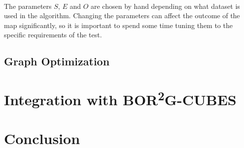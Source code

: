 \documentclass[11pt]{article}
\begin{document}
	\paragraph{}
	The parameters $S$, $E$ and $O$ are chosen by hand depending on what dataset is used in the algorithm. Changing the parameters can affect the outcome of the map significantly, so it is important to spend some time tuning them to the specific requirements of the test.

	\subsection{Graph Optimization}

	\newpage
	\section{Integration with BOR\textsuperscript{2}G-CUBES}
	
	\newpage
	\section{Conclusion}

	\newpage
	
	
\end{document}

